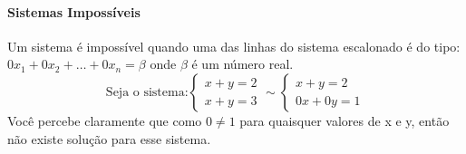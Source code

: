     \paragraph{Sistemas Impossíveis}
    Um sistema é impossível quando uma das linhas do sistema escalonado é do tipo: $0x_1+0x_2+\dots+0x_n=\beta$ onde $\beta$ é um número real.\[
    \text{Seja o sistema:}
    \left\{\begin{array}{l}
      x+y=2\\x+y=3
    \end{array}\right.
    \sim
    \left\{\begin{array}{l}
      x+y=2\\0x+0y=1
   \end{array}\right.\]
   Você percebe claramente que como $0\neq 1$ para quaisquer valores de x e y, então não existe solução para esse sistema.
